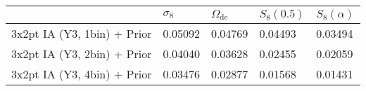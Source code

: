 \begin{tabular}{lllll}
\toprule
{} & $\sigma_8$ & $\Omega_\mathrm{de}$ & $S_8(0.5)$ & $S_8(\alpha)$ \\
\midrule
3x2pt IA (Y3, 1bin) + Prior &    0.05092 &              0.04769 &    0.04493 &       0.03494 \\
3x2pt IA (Y3, 2bin) + Prior &    0.04040 &              0.03628 &    0.02455 &       0.02059 \\
3x2pt IA (Y3, 4bin) + Prior &    0.03476 &              0.02877 &    0.01568 &       0.01431 \\
\bottomrule
\end{tabular}
